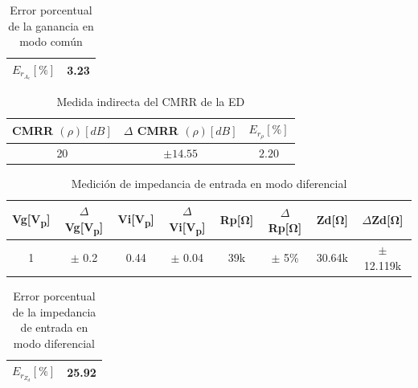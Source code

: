 \begin{enumerate}
        \begin{table}[H]
          \centering
          \begin{tabular}{|c|c|}
            \hline
            $E_{r_{A_c}} [\%]$ & 3.23 \\
            \hline
          \end{tabular}
          \caption{Error porcentual de la ganancia en modo común}
          \label{tab:error_porcentual2_ac}
        \end{table}

        \begin{table}[H]
          \centering
          \begin{tabular}{|c|c|c|}
            \hline
            CMRR $(\rho) [dB]$ & $\Delta$ CMRR $(\rho) [dB]$ & $E_{r_{\rho}} [\%]$ \\
            \hline
            20                 & $\pm 14.55$                 & $2.20$              \\
            \hline
          \end{tabular}
          \caption{Medida indirecta del CMRR de la ED}
          \label{tab:medida_indirecta_cmrr_ed}
        \end{table}


        \begin{table}[H]
          \centering
          \begin{tabular}{|c|c|c|c|c|c|c|c|}
            \hline
            \textbf{Vg[V\textsubscript{p}]} & \textbf{\(\Delta\)Vg[V\textsubscript{p}]} & \textbf{Vi[V\textsubscript{p}]} & \textbf{\(\Delta\)Vi[V\textsubscript{p}]} & \textbf{Rp[Ω]} & \textbf{\(\Delta\)Rp[Ω]} & \textbf{Zd[Ω]} & \textbf{\(\Delta\)Zd[Ω]} \\\hline
            1                               & \(\pm\) 0.2                               & 0.44                            & \(\pm\) 0.04                              & 39k            & \(\pm\) 5\%              & 30.64k         & \(\pm\) 12.119k          \\\hline
          \end{tabular}
          \caption{Medición de impedancia de entrada en modo diferencial}
          \label{tab:impedancia_entrada_diferencial}
        \end{table}


        \begin{table}[H]
          \centering
          \begin{tabular}{|c|c|}
            \hline
            $E_{r_{Z_{d}}} [\%]$ & 25.92 \\
            \hline
          \end{tabular}
          \caption{Error porcentual de la impedancia de entrada en modo diferencial}
          \label{tab:error_porcentual2_zd}
        \end{table}



\end{enumerate}
